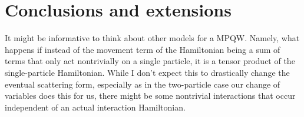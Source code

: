 \documentclass[../thesis-main/thesis-main]{subfiles}
\begin{document}
%
%


\section{Conclusions and extensions}

It might be informative to think about other models for a MPQW.  Namely, what happens if instead of the movement term of the Hamiltonian being a sum of terms that only act nontrivially on a single particle, it is a tensor product of the single-particle Hamiltonian.  While I don't expect this to drastically change the eventual scattering form, especially as in the two-particle case our change of variables does this for us, there might be some nontrivial interactions that occur independent of an actual interaction Hamiltonian.




\biblio{}
\end{document}
